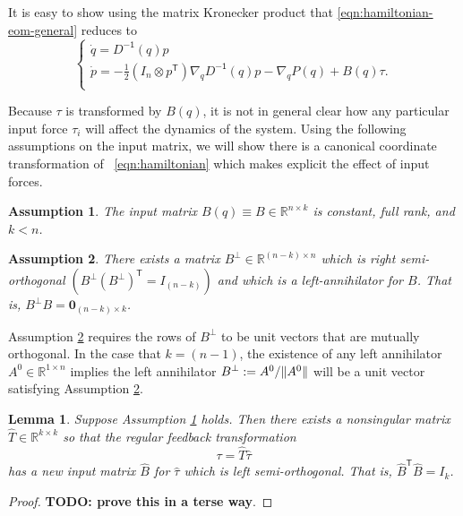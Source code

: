 \documentclass[journal,twoside,web]{ieeecolor}
\newtheorem{lemma}[thm]{Lemma} %
\newtheorem{assm}{Assumption} %
\DeclarePairedDelimiter{\norm}{\lVert}{\rVert}
\newcommand*{\tpose}{^\mathsf{T}}
\newcommand*{\inv}{^\mathsf{-1}}
\newcommand*{\R}{\mathbb{R}}
\newcommand*{\Id}[1]{I_{#1}}
\newcommand*{\Zmat}[1]{\bm{0}_{#1}}
\begin{document}
It is easy to show using the matrix Kronecker product that
\eqref{eqn:hamiltonian-eom-general} reduces to
\begin{equation}\label{eqn:hamiltonian-full-dynamics}
     \begin{cases}
        \dot{q} = D\inv(q)p \\
        \dot{p} = -\frac{1}{2} (\Id{n} \otimes p\tpose) \nabla_q D\inv(q) p
        - \nabla_q P(q) + B(q) \tau
        . \\
    \end{cases}
\end{equation}

Because \(\tau\) is transformed by \(B(q)\), it is not in general clear how any
particular input force \(\tau_i\) will affect the dynamics of the system. 
Using the following assumptions on the input matrix, we will show there is
a canonical coordinate transformation of ~\eqref{eqn:hamiltonian} 
which makes explicit the effect of input forces.

\begin{assm}\label{assm:B-const}
    The input matrix \(B(q) \equiv B \in \R^{n\times k}\) is constant,
    full rank, and \(k < n\).
\end{assm}

\begin{assm}\label{assm:B-perp}
    There exists a matrix 
    \(B^\perp \in \R^{(n-k)\times n}\)
    which is right semi-orthogonal 
    \(\left(B^\perp(B^\perp)\tpose = \Id{(n-k)}\right)\)
    and which is a left-annihilator for \(B\). 
    That is, \(B^\perp B = \Zmat{(n-k) \times k}\).
\end{assm}

Assumption \ref{assm:B-perp} requires the rows of \(B^\perp\) to be unit vectors
that are mutually orthogonal. 
In the case that \(k = (n-1)\), the existence of any left annihilator 
\(A^0 \in \R^{1\times n}\) implies the left annihilator 
\(B^\perp := A^0/\norm{A^0}\) will be a unit vector satisfying Assumption \ref{assm:B-perp}.

\begin{lemma}\label{lemma:B-orthogonal}
    Suppose Assumption \ref{assm:B-const} holds. Then
    there exists a nonsingular matrix \(\hat{T} \in \R^{k \times k}\) 
    so that the regular feedback transformation 
    \[
        \tau = \hat{T} \hat{\tau}
    \] 
    has a new input matrix \(\hat{B}\) for \(\hat{\tau}\) which is left
    semi-orthogonal.  
    That is, \(\hat{B}\tpose \hat{B} = \Id{k}\).
\end{lemma}
\begin{proof}
    \textbf{TODO: prove this in a terse way}.
\end{proof}
\end{document}
